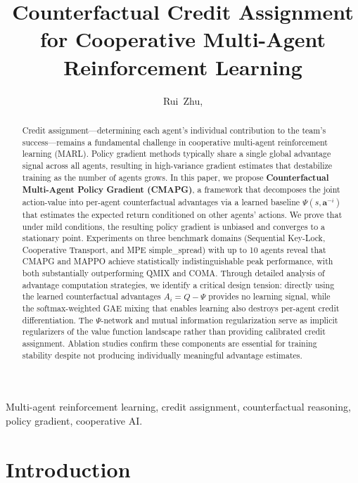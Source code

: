 \documentclass[journal]{IEEEtran}
\begin{document}
\title{Counterfactual Credit Assignment for Cooperative Multi-Agent Reinforcement Learning}

\author{
    Rui~Zhu,
}

\maketitle

\begin{abstract}
Credit assignment---determining each agent's individual contribution to the team's success---remains a fundamental challenge in cooperative multi-agent reinforcement learning (MARL). Policy gradient methods typically share a single global advantage signal across all agents, resulting in high-variance gradient estimates that destabilize training as the number of agents grows. In this paper, we propose \textbf{Counterfactual Multi-Agent Policy Gradient (CMAPG)}, a framework that decomposes the joint action-value into per-agent counterfactual advantages via a learned baseline $\Psi(s, \mathbf{a}^{-i})$ that estimates the expected return conditioned on other agents' actions. We prove that under mild conditions, the resulting policy gradient is unbiased and converges to a stationary point. Experiments on three benchmark domains (Sequential Key-Lock, Cooperative Transport, and MPE simple\_spread) with up to 10 agents reveal that CMAPG and MAPPO achieve statistically indistinguishable peak performance, with both substantially outperforming QMIX and COMA. Through detailed analysis of advantage computation strategies, we identify a critical design tension: directly using the learned counterfactual advantages $A_i = Q - \Psi$ provides no learning signal, while the softmax-weighted GAE mixing that enables learning also destroys per-agent credit differentiation. The $\Psi$-network and mutual information regularization serve as implicit regularizers of the value function landscape rather than providing calibrated credit assignment. Ablation studies confirm these components are essential for training stability despite not producing individually meaningful advantage estimates.
\end{abstract}

\begin{IEEEkeywords}
Multi-agent reinforcement learning, credit assignment, counterfactual reasoning, policy gradient, cooperative AI.
\end{IEEEkeywords}

\section{Introduction}
\label{sec:introduction}
\end{document}
